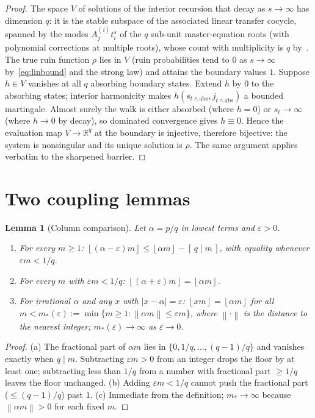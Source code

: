 \documentclass[11pt]{article}
\newtheorem{lemma}[theorem]{Lemma}
\theoremstyle{definition}
\theoremstyle{remark}
\newcommand{\floor}[1]{\left\lfloor #1 \right\rfloor}
\newcommand{\dnorm}[1]{\left\| #1 \right\|}
\begin{document}
\begin{proof}
The space $V$ of solutions of the interior recursion that decay as
$s \to \infty$ has dimension $q$: it is the stable subspace of the
associated linear transfer cocycle, spanned by the modes
$A_j^{(i)} t_i^s$ of the $q$ sub-unit master-equation roots (with
polynomial corrections at multiple roots), whose count with
multiplicity is $q$ by~\cite[Prop.~5.3]{bridge}.
The true ruin function $\rho$ lies in $V$ (ruin probabilities tend to
$0$ as $s \to \infty$ by~\eqref{eq:linbound} and the strong law) and
attains the boundary values $1$.
Suppose $h \in V$ vanishes at all $q$ absorbing boundary states.
Extend $h$ by $0$ to the absorbing states; interior harmonicity makes
$h(s_{t \wedge \text{abs}}, j_{t \wedge \text{abs}})$ a bounded
martingale.
Almost surely the walk is either absorbed (where $h = 0$) or
$s_t \to \infty$ (where $h \to 0$ by decay), so dominated convergence
gives $h \equiv 0$.
Hence the evaluation map $V \to \mathbb{R}^q$ at the boundary is
injective, therefore bijective: the system is nonsingular and its
unique solution is $\rho$.
The same argument applies verbatim to the sharpened barrier.
\end{proof}

\section{Two coupling lemmas}

\begin{lemma}[Column comparison]\label{lem:columns}
Let $\alpha = p/q$ in lowest terms and $\varepsilon > 0$.
\begin{enumerate}
\item[(a)] For every $m \geq 1$:
  $\floor{(\alpha - \varepsilon)m} \leq \floor{\alpha m} - [\,q \mid m\,]$,
  with equality whenever $\varepsilon m < 1/q$.
\item[(b)] For every $m$ with $\varepsilon m < 1/q$:
  $\floor{(\alpha + \varepsilon)m} = \floor{\alpha m}$.
\item[(c)] For irrational $\alpha$ and any $x$ with $|x - \alpha| =
  \varepsilon$: $\floor{x m} = \floor{\alpha m}$ for all
  $m < m_*(\varepsilon) := \min\{m \geq 1 : \dnorm{\alpha m} \leq
  \varepsilon m\}$, where $\dnorm{\cdot}$ is the distance to the nearest
  integer; $m_*(\varepsilon) \to \infty$ as $\varepsilon \to 0$.
\end{enumerate}
\end{lemma}

\begin{proof}
(a) The fractional part of $\alpha m$ lies in
$\{0, 1/q, \ldots, (q-1)/q\}$ and vanishes exactly when $q \mid m$.
Subtracting $\varepsilon m > 0$ from an integer drops the floor by at
least one; subtracting less than $1/q$ from a number with fractional
part $\geq 1/q$ leaves the floor unchanged.
(b) Adding $\varepsilon m < 1/q$ cannot push the fractional part
($\leq (q-1)/q$) past $1$.
(c) Immediate from the definition; $m_* \to \infty$ because
$\dnorm{\alpha m} > 0$ for each fixed $m$.
\end{proof}
\end{document}
